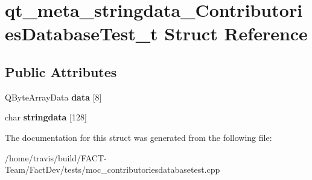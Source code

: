 \hypertarget{structqt__meta__stringdata__ContributoriesDatabaseTest__t}{\section{qt\-\_\-meta\-\_\-stringdata\-\_\-\-Contributories\-Database\-Test\-\_\-t Struct Reference}
\label{structqt__meta__stringdata__ContributoriesDatabaseTest__t}
}
\subsection*{Public Attributes}
\begin{DoxyCompactItemize}
\item 
\hypertarget{structqt__meta__stringdata__ContributoriesDatabaseTest__t_abf0fed12d91488266bca3cda44832025}{Q\-Byte\-Array\-Data {\bfseries data} \mbox{[}8\mbox{]}}\label{structqt__meta__stringdata__ContributoriesDatabaseTest__t_abf0fed12d91488266bca3cda44832025}

\item 
\hypertarget{structqt__meta__stringdata__ContributoriesDatabaseTest__t_a0d231f3ad569509c43399c493b887262}{char {\bfseries stringdata} \mbox{[}128\mbox{]}}\label{structqt__meta__stringdata__ContributoriesDatabaseTest__t_a0d231f3ad569509c43399c493b887262}

\end{DoxyCompactItemize}


The documentation for this struct was generated from the following file\-:\begin{DoxyCompactItemize}
\item 
/home/travis/build/\-F\-A\-C\-T-\/\-Team/\-Fact\-Dev/tests/moc\-\_\-contributoriesdatabasetest.\-cpp\end{DoxyCompactItemize}

